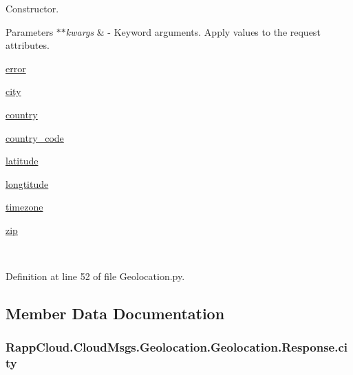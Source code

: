 Constructor. 


\begin{DoxyParams}{Parameters}
{\em $\ast$$\ast$kwargs} & -\/ Keyword arguments. Apply values to the request attributes.
\begin{DoxyItemize}
\item \hyperlink{classRappCloud_1_1CloudMsgs_1_1Geolocation_1_1Geolocation_1_1Response_a98cf8817ae5b56c428daf4512721a897}{error}
\item \hyperlink{classRappCloud_1_1CloudMsgs_1_1Geolocation_1_1Geolocation_1_1Response_a5eb6b3e544e53f8ab1a4a2291dc5b164}{city}
\item \hyperlink{classRappCloud_1_1CloudMsgs_1_1Geolocation_1_1Geolocation_1_1Response_af43fdc30cd729653646d67f31d31c8cf}{country}
\item \hyperlink{classRappCloud_1_1CloudMsgs_1_1Geolocation_1_1Geolocation_1_1Response_afb645e20f09cf80349d7f0c2b82d8a7d}{country\-\_\-code}
\item \hyperlink{classRappCloud_1_1CloudMsgs_1_1Geolocation_1_1Geolocation_1_1Response_a0b5a2ed137077f4035401f5ad67d46a7}{latitude}
\item \hyperlink{classRappCloud_1_1CloudMsgs_1_1Geolocation_1_1Geolocation_1_1Response_a8afb082c846c8c98e9dcbfd917977c34}{longtitude}
\item \hyperlink{classRappCloud_1_1CloudMsgs_1_1Geolocation_1_1Geolocation_1_1Response_ae4b84a77b2e81fa077ee868491950f11}{timezone}
\item \hyperlink{classRappCloud_1_1CloudMsgs_1_1Geolocation_1_1Geolocation_1_1Response_a9ab44ed7266d4683b1b8b899f4f566a1}{zip} 
\end{DoxyItemize}\\
\hline
\end{DoxyParams}


Definition at line 52 of file Geolocation.\-py.



\subsection{Member Data Documentation}
\hypertarget{classRappCloud_1_1CloudMsgs_1_1Geolocation_1_1Geolocation_1_1Response_a5eb6b3e544e53f8ab1a4a2291dc5b164}{
\subsubsection[{city}]{\setlength{\rightskip}{0pt plus 5cm}Rapp\-Cloud.\-Cloud\-Msgs.\-Geolocation.\-Geolocation.\-Response.\-city}}\label{classRappCloud_1_1CloudMsgs_1_1Geolocation_1_1Geolocation_1_1Response_a5eb6b3e544e53f8ab1a4a2291dc5b164}


